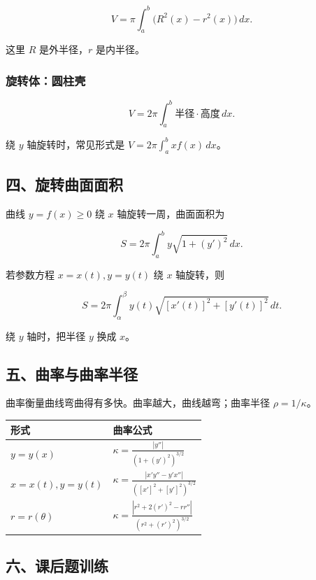 \[
      V=\pi\int_a^b \bigl(R^2(x)-r^2(x)\bigr)\,dx.
    \]

这里 \(R\) 是外半径，\(r\) 是内半径。

\subsubsection*{旋转体：圆柱壳}

\[
      V=2\pi\int_a^b \text{半径}\cdot\text{高度}\,dx.
    \]

绕 \(y\) 轴旋转时，常见形式是 \(V=2\pi\int_a^b x f(x)\,dx\)。

\subsection*{四、旋转曲面面积}

曲线 \(y=f(x)\ge0\) 绕 \(x\) 轴旋转一周，曲面面积为

\[
      S=2\pi\int_a^b y\sqrt{1+(y')^2}\,dx.
    \]

若参数方程 \(x=x(t),y=y(t)\) 绕 \(x\) 轴旋转，则

\[
      S=2\pi\int_\alpha^\beta y(t)\sqrt{[x'(t)]^2+[y'(t)]^2}\,dt.
    \]

绕 \(y\) 轴时，把半径 \(y\) 换成 \(x\)。

\subsection*{五、曲率与曲率半径}

曲率衡量曲线弯曲得有多快。曲率越大，曲线越弯；曲率半径 \(\rho=1/\kappa\)。

\begin{center}
\small
\begin{tabularx}{\linewidth}{|>{\raggedright\arraybackslash}X|>{\raggedright\arraybackslash}X|}
\hline
\textbf{形式} & \textbf{曲率公式} \\ \hline
\(y=y(x)\) & \(\displaystyle \kappa=\frac{|y''|}{(1+(y')^2)^{3/2}}\) \\ \hline
\(x=x(t),y=y(t)\) & \(\displaystyle \kappa=\frac{|x'y''-y'x''|}{([x']^2+[y']^2)^{3/2}}\) \\ \hline
\(r=r(\theta)\) & \(\displaystyle \kappa=\frac{|r^2+2(r')^2-rr''|}{(r^2+(r')^2)^{3/2}}\) \\ \hline
\end{tabularx}
\end{center}

\subsection*{六、课后题训练}

